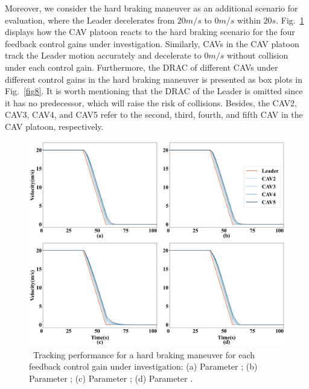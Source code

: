 \documentclass[a4paper]{cas-sc}
\begin{document}
Moreover, we consider the hard braking maneuver as an additional scenario for evaluation, where the Leader decelerates from $20m/s$ to $0m/s$ within $20s$. Fig.~\ref{fig7} displays how the CAV platoon reacts to the hard braking scenario for the four feedback control gains under investigation. Similarly, CAVs in the CAV platoon track the Leader motion accurately and decelerate to $0m/s$ without collision under each control gain. Furthermore, the DRAC of different CAVs under different control gains in the hard braking maneuver is presented as box plots in Fig.~\ref{fig8}. It is worth mentioning that the DRAC of the Leader is omitted since it has no predecessor, which will raise the risk of collisions. Besides, the CAV2, CAV3, CAV4, and CAV5 refer to the second, third, fourth, and fifth CAV in the CAV platoon, respectively.

\begin{figure}

  \centering
  \includegraphics[width=14cm]{figs/fig7.png}
  \caption{~Tracking performance for a hard braking maneuver for each feedback control gain under investigation: (a) Parameter \uppercase\expandafter{}; (b) Parameter \uppercase\expandafter{}; (c) Parameter \uppercase\expandafter{}; (d) Parameter \uppercase\expandafter{}.}
  \label{fig7}
\end{figure}
\end{document}
